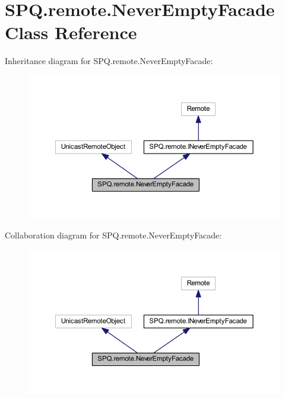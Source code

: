 \hypertarget{class_s_p_q_1_1remote_1_1_never_empty_facade}{}\section{S\+P\+Q.\+remote.\+Never\+Empty\+Facade Class Reference}
\label{class_s_p_q_1_1remote_1_1_never_empty_facade}


Inheritance diagram for S\+P\+Q.\+remote.\+Never\+Empty\+Facade\+:\nopagebreak
\begin{figure}[H]
\begin{center}
\leavevmode
\includegraphics[width=350pt]{class_s_p_q_1_1remote_1_1_never_empty_facade__inherit__graph}
\end{center}
\end{figure}


Collaboration diagram for S\+P\+Q.\+remote.\+Never\+Empty\+Facade\+:\nopagebreak
\begin{figure}[H]
\begin{center}
\leavevmode
\includegraphics[width=350pt]{class_s_p_q_1_1remote_1_1_never_empty_facade__coll__graph}
\end{center}
\end{figure}
